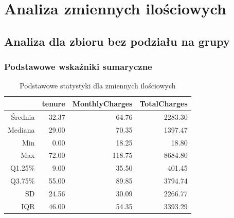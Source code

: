 \documentclass[12pt, a4paper]{article}\usepackage[]{graphicx}\usepackage[]{xcolor}
\begin{document}
\newpage
\section{Analiza zmiennych ilościowych}

\subsection{Analiza dla zbioru bez podziału na grupy}

\subsubsection{Podstawowe wskaźniki sumaryczne}
\begin{table}[ht]
\centering
\caption{Podstawowe statystyki dla zmiennych ilościowych} 
\label{tab:stats_all}
\begin{tabular}{rrrr}
  \hline
 & tenure & MonthlyCharges & TotalCharges \\ 
  \hline
Średnia & 32.37 & 64.76 & 2283.30 \\ 
  Mediana & 29.00 & 70.35 & 1397.47 \\ 
  Min & 0.00 & 18.25 & 18.80 \\ 
  Max & 72.00 & 118.75 & 8684.80 \\ 
  Q1.25\% & 9.00 & 35.50 & 401.45 \\ 
  Q3.75\% & 55.00 & 89.85 & 3794.74 \\ 
  SD & 24.56 & 30.09 & 2266.77 \\ 
  IQR & 46.00 & 54.35 & 3393.29 \\ 
   \hline
\end{tabular}
\end{table}


\newpage
\end{document}
